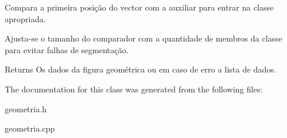 Compara a primeira posição do vector com a auxiliar para entrar na classe apropriada.

Ajusta-\/se o tamanho do comparador com a quantidade de membros da classe para evitar falhas de segmentação. \begin{DoxyReturn}{Returns}
Os dados da figura geométrica ou em caso de erro a lista de dados.
\end{DoxyReturn}


The documentation for this class was generated from the following files\+:\begin{DoxyCompactItemize}
\item 
geometria.\+h\item 
geometria.\+cpp\end{DoxyCompactItemize}
